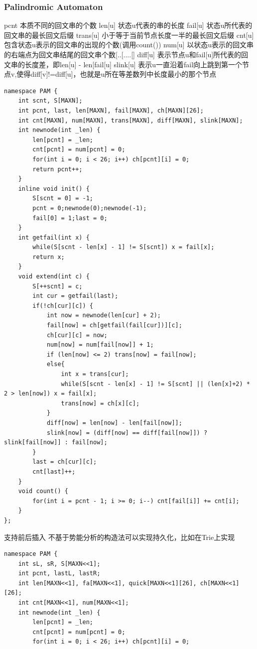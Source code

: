 \documentclass[10pt]{ctexart}
\begin{document}
{\subsubsection{Palindromic Automaton}
pcnt 本质不同的回文串的个数
len[u] 状态u代表的串的长度
fail[u] 状态u所代表的回文串的最长回文后缀
trans[u] 小于等于当前节点长度一半的最长回文后缀
cnt[u] 包含状态u表示的回文串的出现的个数(调用count())
num[u] 以状态u表示的回文串的右端点为回文串结尾的回文串个数[..[....[]
diff[u] 表示节点u和fail[u]所代表的回文串的长度差，即len[u] - len[fail[u]
slink[u] 表示u一直沿着fail向上跳到第一个节点v,使得diff[v]!=diff[u]，也就是u所在等差数列中长度最小的那个节点
\begin{lstlisting}
namespace PAM {
    int scnt, S[MAXN];
    int pcnt, last, len[MAXN], fail[MAXN], ch[MAXN][26];
    int cnt[MAXN], num[MAXN], trans[MAXN], diff[MAXN], slink[MAXN];
    int newnode(int _len) {
        len[pcnt] = _len;
        cnt[pcnt] = num[pcnt] = 0;
        for(int i = 0; i < 26; i++) ch[pcnt][i] = 0;
        return pcnt++;
    }
    inline void init() {
        S[scnt = 0] = -1;
        pcnt = 0;newnode(0);newnode(-1);
        fail[0] = 1;last = 0;
    }
    int getfail(int x) {
        while(S[scnt - len[x] - 1] != S[scnt]) x = fail[x];
        return x;
    }
    void extend(int c) {
        S[++scnt] = c;
        int cur = getfail(last);
        if(!ch[cur][c]) {
            int now = newnode(len[cur] + 2);
            fail[now] = ch[getfail(fail[cur])][c];
            ch[cur][c] = now;
            num[now] = num[fail[now]] + 1;
            if (len[now] <= 2) trans[now] = fail[now];
            else{
                int x = trans[cur]; 
                while(S[scnt - len[x] - 1] != S[scnt] || (len[x]+2) * 2 > len[now]) x = fail[x];
                trans[now] = ch[x][c];
            }
            diff[now] = len[now] - len[fail[now]];
            slink[now] = (diff[now] == diff[fail[now]]) ? slink[fail[now]] : fail[now];
        }
        last = ch[cur][c];
        cnt[last]++;
    }
    void count() {
        for(int i = pcnt - 1; i >= 0; i--) cnt[fail[i]] += cnt[i];
    }
};
\end{lstlisting}
支持前后插入
不基于势能分析的构造法可以实现持久化，比如在Trie上实现
\begin{lstlisting}
namespace PAM {
    int sL, sR, S[MAXN<<1];
    int pcnt, lastL, lastR;
    int len[MAXN<<1], fa[MAXN<<1], quick[MAXN<<1][26], ch[MAXN<<1][26];
    int cnt[MAXN<<1], num[MAXN<<1];
    int newnode(int _len) {
        len[pcnt] = _len;
        cnt[pcnt] = num[pcnt] = 0;
        for(int i = 0; i < 26; i++) ch[pcnt][i] = 0;

\end{lstlisting}}
\end{document}
